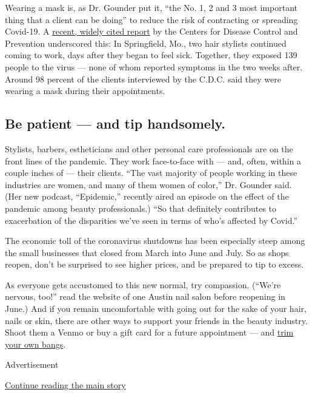 Wearing a mask is, as Dr. Gounder put it, ``the No. 1, 2 and 3 most
important thing that a client can be doing'' to reduce the risk of
contracting or spreading Covid-19. A
\href{https://www.cdc.gov/mmwr/volumes/69/wr/mm6928e2.htm}{recent,
widely cited report} by the Centers for Disease Control and Prevention
underscored this: In Springfield, Mo., two hair stylists continued
coming to work, days after they began to feel sick. Together, they
exposed 139 people to the virus --- none of whom reported symptoms in
the two weeks after. Around 98 percent of the clients interviewed by the
C.D.C. said they were wearing a mask during their appointments.

\hypertarget{be-patient--and-tip-handsomely}{%
\subsection{Be patient --- and tip
handsomely.}\label{be-patient--and-tip-handsomely}}

Stylists, barbers, estheticians and other personal care professionals
are on the front lines of the pandemic. They work face-to-face with ---
and, often, within a couple inches of --- their clients. ``The vast
majority of people working in these industries are women, and many of
them women of color,'' Dr. Gounder said. (Her new podcast, ``Epidemic,''
recently aired an episode on the effect of the pandemic among beauty
professionals.) ``So that definitely contributes to exacerbation of the
disparities we've seen in terms of who's affected by Covid.''

The economic toll of the coronavirus shutdowns has been especially steep
among the small businesses that closed from March into June and July. So
as shops reopen, don't be surprised to see higher prices, and be
prepared to tip to excess.

As everyone gets accustomed to this new normal, try compassion. (``We're
nervous, too!'' read the website of one Austin nail salon before
reopening in June.) And if you remain uncomfortable with going out for
the sake of your hair, nails or skin, there are other ways to support
your friends in the beauty industry. Shoot them a Venmo or buy a gift
card for a future appointment --- and
\href{https://www.nytimes3xbfgragh.onion/2020/04/23/style/self-care/quarantine-cut-your-own-bangs-coronavirus.html}{trim
your own bangs}.

Advertisement

\protect\hyperlink{after-bottom}{Continue reading the main story}

